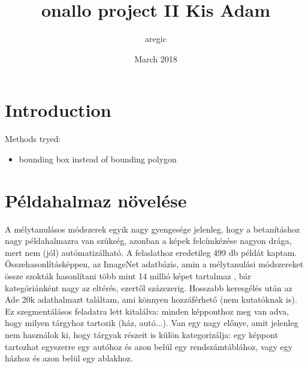 \documentclass{article}
\title{onallo project II Kis Adam}
\author{aregic}
\date{March 2018}
\begin{document}
\maketitle

\section{Introduction}

\begin{multicols}{2}

Methods tryed:
\begin{itemize}
    \item bounding box instead of bounding polygon
\end{itemize}

\end{multicols}

\section{Példahalmaz növelése}
A mélytanulásos módszerek egyik nagy gyengesége jelenleg, hogy a betanításhoz nagy példahalmazra van szükség, azonban a képek felcímkézése nagyon drága, mert nem (jól) autómatizálható. A feladathoz eredetileg 499 db példát kaptam. Összehasonlításképpen, az ImageNet adatbázis, amin a mélytanulási módszereket össze szokták hasonlítani több mint 14 millió képet tartalmaz \cite{imagenet_database}, bár kategóriánként nagy az eltérés, ezertől százezerig. Hosszabb keresgélés után az Ade 20k adathalmazt találtam, ami könnyen hozzáférhető (nem kutatóknak is)\cite{ade20k_database}. Ez szegmentálásos feladatra lett kitalálva: minden képponthoz meg van adva, hogy milyen tárgyhoz tartozik (ház, autó...). Van egy nagy előnye, amit jelenleg nem használok ki, hogy tárgyak részeit is külön kategorizálja: egy képpont tartozhat egyszerre egy autóhoz és azon belül egy rendszámtáblához, vagy egy házhoz és azon belül egy ablakhoz.
\end{document}
